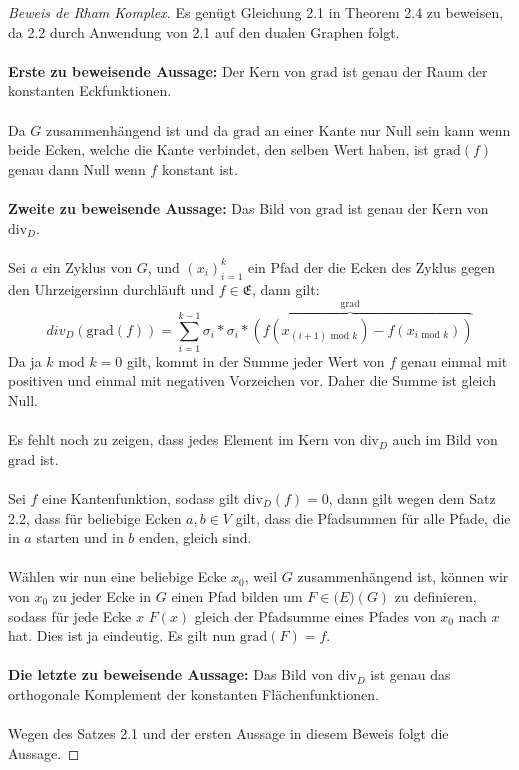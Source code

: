 \documentclass[11pt,a4paper,leqno]{report}
\numberwithin{equation}{chapter}
\begin{document}
\begin{proof}[Beweis de Rham Komplex]
	Es gen\"ugt Gleichung 2.1 in Theorem 2.4 zu beweisen, da 2.2 durch Anwendung von 2.1 auf den dualen Graphen folgt.\\
	\\
	\textbf{Erste zu beweisende Aussage:} Der Kern von $\text{grad}$ ist genau der Raum der konstanten Eckfunktionen.\\
	\\
	Da $G$ zusammenh\"angend ist und da $\text{grad}$ an einer Kante nur Null sein kann wenn beide Ecken, welche die Kante verbindet, den selben Wert haben, ist $\text{grad}(f)$ genau dann Null wenn $f$ konstant ist.\\
	\\
	\textbf{Zweite zu beweisende Aussage:} Das Bild von $\text{grad}$ ist genau der Kern von $\text{div}_D$.\\
	\\
	Sei $a$ ein Zyklus von $G$, und $(x_i)_{i=1}^k$ ein Pfad der die Ecken des Zyklus gegen den Uhrzeigersinn durchl\"auft und $f\in\mathfrak{E}$, dann gilt:
	$$div_D(\text{grad}(f)) = \sum_{i=1}^{k-1} \sigma_i * \overbrace{\sigma_i * (f(x_{(i+1) \text{ mod } k})-f(x_{i  \text{ mod } k}))}^{\text{grad}}$$
	Da ja $k \text{ mod }k=0$ gilt, kommt in der Summe jeder Wert von $f$ genau einmal mit positiven und einmal mit negativen Vorzeichen vor. Daher die Summe ist gleich Null.\\
	\\
	Es fehlt noch zu zeigen, dass jedes Element im Kern von $\text{div}_D$ auch im Bild von $\text{grad}$ ist.\\
	\\
	Sei $f$ eine Kantenfunktion, sodass gilt $\text{div}_D(f)=0$, dann gilt wegen dem Satz 2.2, dass f\"ur beliebige Ecken $a, b\in V$ gilt, dass die Pfadsummen f\"ur alle Pfade, die in $a$ starten und in $b$ enden, gleich sind.\\
	\\
	W\"ahlen wir nun eine beliebige Ecke $x_0$, weil $G$ zusammenh\"angend ist, k\"onnen wir von $x_0$ zu jeder Ecke in $G$ einen Pfad bilden um $F\in\mathfrak(E)(G)$ zu definieren, sodass f\"ur jede Ecke $x$ $F(x)$ gleich der Pfadsumme eines Pfades von $x_0$ nach $x$ hat. Dies ist ja eindeutig. Es gilt nun $\text{grad}(F) = f$.
	\\
	\\
	\textbf{Die letzte zu beweisende Aussage:} Das Bild von $\text{div}_D$ ist genau das orthogonale Komplement der konstanten Fl\"achenfunktionen.\\
	\\
	Wegen des Satzes 2.1 und der ersten Aussage in diesem Beweis folgt die Aussage.
\end{proof}
\noindent
\end{document}
